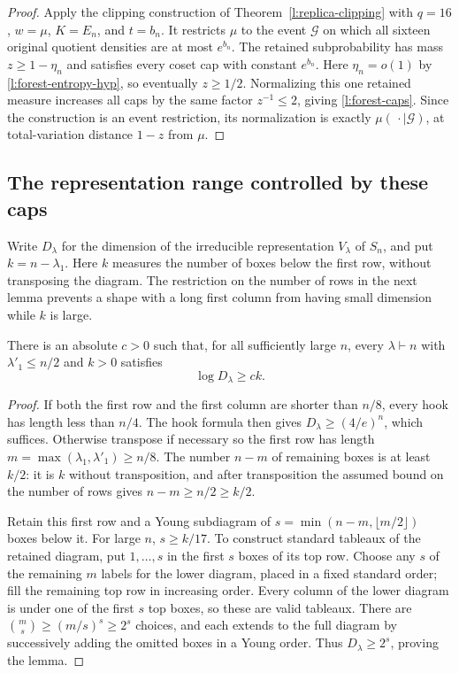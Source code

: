 \begin{proof}
Apply the clipping construction of Theorem~\ref{l:replica-clipping}
with $q=16$, $w=\mu$, $K=E_n$, and $t=b_n$. It restricts $\mu$
to the event $\mathcal G$ on which all sixteen original quotient
densities are at most $e^{b_n}$. The retained subprobability has
mass $z\ge1-\eta_n$ and satisfies every coset cap with constant
$e^{b_n}$. Here $\eta_n=o(1)$ by \eqref{l:forest-entropy-hyp},
so eventually $z\ge1/2$. Normalizing this one retained measure
increases all caps by the same factor $z^{-1}\le2$, giving
\eqref{l:forest-caps}. Since the construction is an event restriction,
its normalization is exactly $\mu(\,\cdot\mid\mathcal G)$, at
total-variation distance $1-z$ from $\mu$.
\end{proof}

\subsection{The representation range controlled by these caps}

Write $D_\lambda$ for the dimension of the irreducible representation
$V_\lambda$ of $S_n$, and put $k=n-\lambda_1$.  Here $k$ measures the
number of boxes below the first row, without transposing the diagram.
The restriction on the number of rows in the next lemma prevents a shape with a long
first column from having small dimension while $k$ is large.

\begin{lemma}
\label{l:forest-degree}
There is an absolute $c>0$ such that, for all sufficiently large $n$,
every $\lambda\vdash n$ with $\lambda'_1\le n/2$ and $k>0$ satisfies
\begin{equation}
 \log D_\lambda\ge ck.
 \label{l:forest-degree-bound}
\end{equation}
\end{lemma}

\begin{proof}
If both the first row and the first column are shorter than $n/8$,
every hook has length less than $n/4$.  The hook formula then gives
$D_\lambda\ge(4/e)^n$, which suffices.
Otherwise transpose if necessary so the first row has length
$m=\max(\lambda_1,\lambda'_1)\ge n/8$.
The number $n-m$ of remaining boxes is at least $k/2$: it is $k$
without transposition, and after transposition the assumed bound on the number of rows
gives $n-m\ge n/2\ge k/2$.

Retain this first row and a Young subdiagram of
$s=\min(n-m,\lfloor m/2\rfloor)$ boxes below it.  For large $n$,
$s\ge k/17$.  To construct standard tableaux of the retained diagram,
put $1,\ldots,s$ in the first $s$ boxes of its top row.  Choose any
$s$ of the remaining $m$ labels for the lower diagram, placed in a fixed
standard order; fill the remaining top row in increasing order.
Every column of the lower diagram is under one of the first $s$ top
boxes, so these are valid tableaux.  There are
$\binom ms\ge(m/s)^s\ge2^s$ choices, and each extends to the full
diagram by successively adding the omitted boxes in a Young order.
Thus $D_\lambda\ge2^s$, proving the lemma.
\end{proof}

